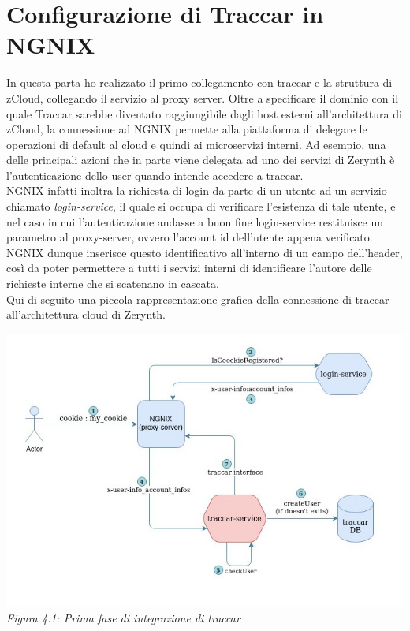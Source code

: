 \documentclass[a4paper,titlepage,12pt]{book}
\begin{document}
\section{\sffamily
Configurazione di Traccar in NGNIX}
In questa parta ho realizzato il primo collegamento con traccar e la struttura di zCloud, collegando il servizio al proxy server. Oltre a specificare il dominio con il quale Traccar sarebbe diventato raggiungibile dagli host esterni all'architettura di zCloud, la connessione ad NGNIX permette alla piattaforma di delegare le operazioni di default al cloud e quindi ai microservizi interni. Ad esempio, una delle principali azioni che in parte viene delegata ad uno dei servizi di Zerynth è l'autenticazione dello user quando intende accedere a traccar. \\
NGNIX infatti inoltra la richiesta di login da parte di un utente ad un servizio chiamato \textit{login-service}, il quale si occupa di verificare l'esistenza di tale utente, e nel caso in cui l'autenticazione andasse a buon fine login-service restituisce un parametro al proxy-server, ovvero l'account id dell'utente appena verificato. NGNIX dunque inserisce questo identificativo all'interno di un campo dell'header, così da poter permettere a tutti i servizi interni di identificare l'autore delle richieste interne che si scatenano in cascata.\\
Qui di seguito una piccola rappresentazione grafica della connessione di traccar all'architettura cloud di Zerynth.\\

\begin{center}
\centering
\includegraphics[scale=0.6]{images/traccar_login_serv.jpg}\\ 
\textit{Figura 4.1: Prima fase di integrazione di traccar}\label{fig:}

\end{center}
\end{document}

